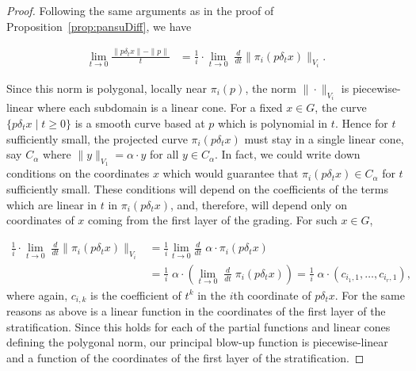 \documentclass{article}
\theoremstyle{definition}
\newcommand{\ddt}{\frac{d}{dt}}
\newcommand{\norm}[1]{\|#1\|}
\begin{document}
\begin{proof}
Following the same arguments as in the proof of Proposition~\ref{prop:pansuDiff}, we have

\begin{align*}
\lim_{t\to 0}\frac{\norm{p\delta_t x} - \norm{p}}{t}
&= \frac{1}{i}\cdot \lim_{t\to0} \;\ddt \norm{\pi_i(p\delta_t x)}_{V_i}.
\end{align*}

Since this norm is polygonal, locally near $\pi_i(p)$, the norm $\norm{\cdot}_{V_i}$ is piecewise-linear where each subdomain is a linear cone.
For a fixed $x \in G$, the curve $\{p\delta_tx\mid t\geq0\}$ is a smooth curve based at $p$ which is polynomial in $t$. Hence for $t$ sufficiently small, the projected curve $\pi_i(p\delta_t x)$ must stay in a single linear cone, say $C_\alpha$ where $\norm{y}_{V_1} = \alpha \cdot y$ for all $y \in C_\alpha$. In fact, we could write down conditions on the coordinates $x$ which would guarantee that $\pi_i(p\delta_tx) \in C_\alpha$ for $t$ sufficiently small. These conditions will depend on the coefficients of the terms which are linear in $t$ in $\pi_i(p\delta_tx)$, and, therefore, will depend only on coordinates of $x$ coming from the first layer of the grading. For such $x \in G$, 

\begin{align*}
\frac{1}{i}\cdot \lim_{t\to0} \;\ddt \norm{\pi_i(p\delta_t x)}_{V_i} &= \frac1i \lim_{t\to 0}\ddt\; \alpha \cdot \pi_i(p\delta_tx)\\
& = \frac1i \;\alpha\cdot \left(\lim_{t\to 0}\;\ddt\; \pi_i(p\delta_tx)\right) = \frac1i \; \alpha \cdot (c_{i_1,1}, \ldots, c_{i_r,1}),
\end{align*}
where again, $c_{i,k}$ is the coefficient of $t^k$ in the $i$th coordinate of $p\delta_t x$. For the same reasons as above is a linear function in the coordinates of the first layer of the stratification. Since this holds for each of the partial functions and linear cones defining the polygonal norm, our principal blow-up function is piecewise-linear and a function of the coordinates of the first layer of the stratification.

\end{proof}
\end{document}
